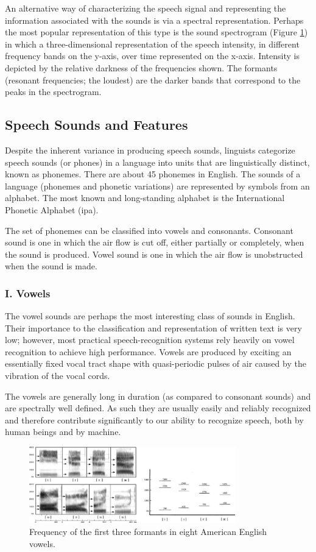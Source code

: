 \documentclass[12pt, a4paper, twoside]{report}
\begin{document}
An alternative way of characterizing the speech signal and representing the information associated with the sounds is via a spectral representation. Perhaps the most popular representation of this type is the sound spectrogram (Figure \ref{fig:freq-three-formants}) in which a three-dimensional representation of the speech intensity, in different frequency bands on the y-axis, over time represented on the x-axis. Intensity is depicted by the relative darkness of the frequencies shown. The formants (resonant frequencies; the loudest) are the darker bands that correspond to the peaks in the spectrogram.

\subsection{Speech Sounds and Features}
Despite the inherent variance in producing speech sounds, linguists categorize speech sounds (or phones) in a language into units that are linguistically distinct, known as phonemes. There are about 45 phonemes in English. The sounds of a language (phonemes and phonetic variations) are represented by symbols from an alphabet. The most known and long-standing alphabet is the International Phonetic Alphabet (\acrshort{ipa}).
\par
The set of phonemes can be classified into vowels and consonants. Consonant sound is one in which the air flow is cut off, either partially or completely, when the sound is produced. Vowel sound is one in which the air flow is unobstructed when the sound is made.
\subsubsection{I. Vowels}
The vowel sounds are perhaps the most interesting class of sounds in English. Their importance to the classification and representation of written text is very low; however, most practical speech-recognition systems rely heavily on vowel recognition to achieve high performance. Vowels are produced by exciting an essentially fixed vocal tract shape with quasi-periodic pulses of air caused by the vibration of the vocal cords.
\par
The vowels are generally long in duration (as compared to consonant sounds) and are spectrally well defined. As such they are usually easily and reliably recognized and therefore contribute significantly to our ability to recognize speech, both by human beings and by machine.

\begin{figure}[ht]
	\centering
	\includegraphics[width=0.8\textwidth]
	{images/chapter2/freq-three-formants}
	\caption{Frequency of the first three formants in eight American English vowels.}
	\label{fig:freq-three-formants}
\end{figure}
\end{document}
